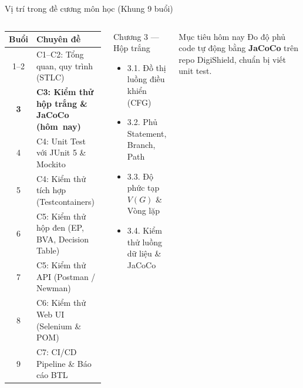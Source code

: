 \documentclass[aspectratio=169,12pt]{beamer}
\begin{document}
\begin{frame}[shrink=10]{Vị trí trong đề cương môn học (Khung 9 buổi)}
  \begin{columns}[T]
    {\footnotesize
    \renewcommand{\arraystretch}{1.1}
    \begin{tabularx}{\linewidth}{@{}c @{\hspace{8pt}} >{\raggedright\arraybackslash}X@{}}
      \toprule
      \textbf{Buổi} & \textbf{Chuyên đề} \\
      \midrule
      1--2 & C1--C2: Tổng quan, quy trình (STLC) \\
      \rowcolor{blue!20}
      \textbf{3} & \textbf{C3: Kiểm thử hộp trắng \& JaCoCo (hôm~nay)} \\
      4 & C4: Unit Test với JUnit 5 \& Mockito \\
      5 & C4: Kiểm thử tích hợp (Testcontainers) \\
      6 & C5: Kiểm thử hộp đen (EP, BVA, Decision Table) \\
      7 & C5: Kiểm thử API (Postman / Newman) \\
      8 & C6: Kiểm thử Web UI (Selenium \& POM) \\
      9 & C7: CI/CD Pipeline \& Báo cáo BTL \\
      \bottomrule
    \end{tabularx}}

    \begin{block}{Chương 3 --- Hộp trắng}
      \scriptsize
      \begin{itemize}\setlength{\itemsep}{0.05em}
        \item 3.1. Đồ thị luồng điều khiển (CFG)
        \item 3.2. Phủ Statement, Branch, Path
        \item 3.3. Độ phức tạp $V(G)$ \& Vòng lặp
        \item 3.4. Kiểm thử luồng dữ liệu \& JaCoCo
      \end{itemize}
    \end{block}
    \vspace{0.1em}
    \begin{alertblock}{Mục tiêu hôm nay}
      \scriptsize Đo độ phủ code tự động bằng \textbf{JaCoCo} trên repo DigiShield, chuẩn bị viết unit test.
    \end{alertblock}
  \end{columns}
\end{frame}
\end{document}
